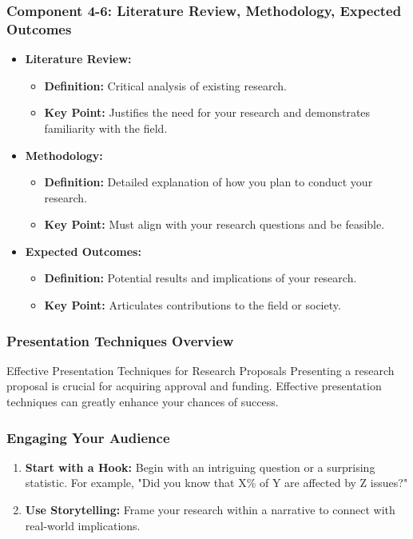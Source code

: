 \documentclass[aspectratio=169]{beamer}
\begin{document}
\begin{frame}[fragile]
  \frametitle{Component 4-6: Literature Review, Methodology, Expected Outcomes}
  \begin{itemize}
    \item \textbf{Literature Review:}
      \begin{itemize}
        \item \textbf{Definition:} Critical analysis of existing research.
        \item \textbf{Key Point:} Justifies the need for your research and demonstrates familiarity with the field.
      \end{itemize}
    \item \textbf{Methodology:}
      \begin{itemize}
        \item \textbf{Definition:} Detailed explanation of how you plan to conduct your research.
        \item \textbf{Key Point:} Must align with your research questions and be feasible.
      \end{itemize}
    \item \textbf{Expected Outcomes:}
      \begin{itemize}
        \item \textbf{Definition:} Potential results and implications of your research.
        \item \textbf{Key Point:} Articulates contributions to the field or society.
      \end{itemize}
  \end{itemize}
\end{frame}

\begin{frame}[fragile]
    \frametitle{Presentation Techniques Overview}
    \begin{block}{Effective Presentation Techniques for Research Proposals}
        Presenting a research proposal is crucial for acquiring approval and funding. Effective presentation techniques can greatly enhance your chances of success. 
    \end{block}
\end{frame}

\begin{frame}[fragile]
    \frametitle{Engaging Your Audience}
    \begin{enumerate}
        \item \textbf{Start with a Hook:} Begin with an intriguing question or a surprising statistic. For example, "Did you know that X\% of Y are affected by Z issues?"
        \item \textbf{Use Storytelling:} Frame your research within a narrative to connect with real-world implications.
    \end{enumerate}
\end{frame}
\end{document}
